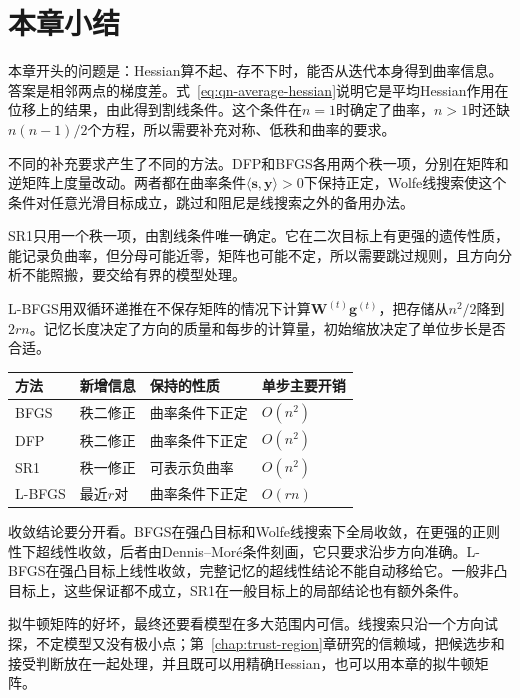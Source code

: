 \section{本章小结}
\label{sec:qn-summary}

本章开头的问题是：Hessian算不起、存不下时，能否从迭代本身得到曲率信息。答案是相邻两点的梯度差。式~\eqref{eq:qn-average-hessian}说明它是平均Hessian作用在位移上的结果，由此得到割线条件。这个条件在$n=1$时确定了曲率，$n>1$时还缺$n(n-1)/2$个方程，所以需要补充对称、低秩和曲率的要求。

不同的补充要求产生了不同的方法。DFP和BFGS各用两个秩一项，分别在矩阵和逆矩阵上度量改动。两者都在曲率条件$\langle\bm{s},\bm{y}\rangle>0$下保持正定，Wolfe线搜索使这个条件对任意光滑目标成立，跳过和阻尼是线搜索之外的备用办法。

SR1只用一个秩一项，由割线条件唯一确定。它在二次目标上有更强的遗传性质，能记录负曲率，但分母可能近零，矩阵也可能不定，所以需要跳过规则，且方向分析不能照搬，要交给有界的模型处理。

L-BFGS用双循环递推在不保存矩阵的情况下计算$\bm{W}^{(t)}\bm{g}^{(t)}$，把存储从$n^2/2$降到$2rn$。记忆长度决定了方向的质量和每步的计算量，初始缩放决定了单位步长是否合适。

\begin{BookInlineTable}
  \centering
  \begin{tabular}{llll}
    \toprule
    方法 & 新增信息 & 保持的性质 & 单步主要开销\\
    \midrule
    BFGS & 秩二修正 & 曲率条件下正定 & $O(n^2)$\\
    DFP & 秩二修正 & 曲率条件下正定 & $O(n^2)$\\
    SR1 & 秩一修正 & 可表示负曲率 & $O(n^2)$\\
    L-BFGS & 最近$r$对 & 曲率条件下正定 & $O(rn)$\\
    \bottomrule
  \end{tabular}
  \caption{本章四种拟牛顿方法的比较。}
  \label{tab:qn-summary}
\end{BookInlineTable}

收敛结论要分开看。BFGS在强凸目标和Wolfe线搜索下全局收敛，在更强的正则性下超线性收敛，后者由Dennis--Mor\'e条件刻画，它只要求沿步方向准确。L-BFGS在强凸目标上线性收敛，完整记忆的超线性结论不能自动移给它。一般非凸目标上，这些保证都不成立，SR1在一般目标上的局部结论也有额外条件。

拟牛顿矩阵的好坏，最终还要看模型在多大范围内可信。线搜索只沿一个方向试探，不定模型又没有极小点；第~\ref{chap:trust-region}章研究的信赖域，把候选步和接受判断放在一起处理，并且既可以用精确Hessian，也可以用本章的拟牛顿矩阵。
